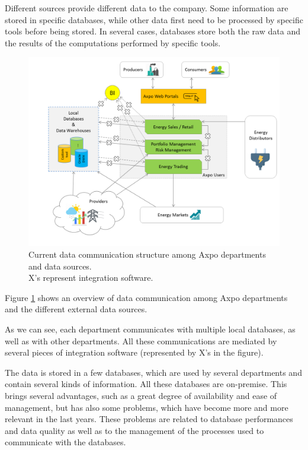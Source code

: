 Different sources provide different data to the company.
Some information are stored in specific databases, while other data first need to be processed by specific tools before being stored.
In several cases, databases store both the raw data and the results of the computations performed by specific tools.

\begin{figure}
    \centering
    \includegraphics[width=\textwidth]{res/architecture/arch_start.png}
    \caption{
        Current data communication structure among Axpo departments and data sources.\\
        X's represent integration software.
    }
    \label{fig:architecture:start}
\end{figure}

Figure \ref{fig:architecture:start} shows an overview of data communication among Axpo departments and the different external data sources.

As we can see, each department communicates with multiple local databases, as well as with other departments.
All these communications are mediated by several pieces of integration software (represented by X's in the figure).

The data is stored in a few databases, which are used by several departments and contain several kinds of information.
All these databases are on-premise.
This brings several advantages, such as a great degree of availability and ease of management, but has also some problems, which have become more and more relevant in the last years.
These problems are related to database performances and data quality as well as to the management of the processes used to communicate with the databases.

